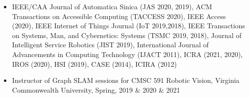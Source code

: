 
\begin{justify}
	\begin{itemize}[before=\fontsize{9pt}{1em}\bodyfontlight\upshape\color{text},leftmargin=3ex, nosep, noitemsep]
		\setlength{\parskip}{0pt}
		\renewcommand{\labelitemi}{\bullet}
		\item[] {IEEE/CAA Journal of Automatica Sinica (JAS 2020, 2019), ACM Transactions on Accessible Computing (TACCESS 2020), IEEE Access (2020), IEEE Internet of Things Journal (IoT 2019,2018), IEEE Transactions on Systems, Man, and Cybernetics: Systems (TSMC 2019, 2018), Journal of Intelligent Service Robotics (JIST 2019), International Journal of Advancements in Computing Technology (IJACT 2011), ICRA (2021, 2020), IROS (2020), HSI (2019), CASE (2014), ICIRA (2012)}
	\end{itemize}
\end{justify}



\begin{justify}
	\begin{itemize}[before=\fontsize{9pt}{1em}\bodyfontlight\upshape\color{text},leftmargin=3ex, nosep, noitemsep]
		\setlength{\parskip}{0pt}
		\renewcommand{\labelitemi}{\bullet}
		\item[] {Instructor of Graph SLAM sessions for CMSC 591 Robotic Vision, Virginia Commonwealth University, Spring, 2019 \& 2020 \& 2021}
	\end{itemize}
\end{justify}




